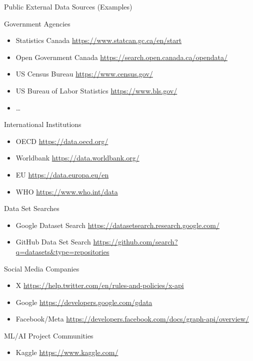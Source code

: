 \documentclass[ignorenonframetext,xcolor=x11names]{beamer}
\begin{document}
\begin{frame}[allowframebreaks]{Public External Data Sources (Examples)}
\begin{block}{Government Agencies}
\begin{itemize}
	\item Statistics Canada \url{https://www.statcan.gc.ca/en/start}
	\item Open Government Canada \url{https://search.open.canada.ca/opendata/}
	\item US Census Bureau \url{https://www.census.gov/}
	\item US Bureau of Labor Statistics \url{https://www.bls.gov/}
	\item \ldots
\end{itemize}
\end{block}
\begin{block}{International Institutions}
\begin{itemize}
	\item OECD \url{https://data.oecd.org/}
	\item Worldbank \url{https://data.worldbank.org/}
	\item EU \url{https://data.europa.eu/en}
	\item WHO \url{https://www.who.int/data}
\end{itemize}
\end{block}
\begin{block}{Data Set Searches}
\begin{itemize}
	\item Google Dataset Search \url{https://datasetsearch.research.google.com/}
	\item GitHub Data Set Search \url{https://github.com/search?q=datasets&type=repositories}
\end{itemize}
\end{block}
\begin{block}{Social Media Companies}
\begin{itemize}
	\item X \url{https://help.twitter.com/en/rules-and-policies/x-api}
	\item Google \url{https://developers.google.com/gdata}
	\item Facebook/Meta \url{https://developers.facebook.com/docs/graph-api/overview/}
\end{itemize}
\end{block}
\begin{block}{ML/AI Project Communities}
\begin{itemize}
	\item Kaggle \url{https://www.kaggle.com/}

\end{itemize}
\end{block}
\end{frame}
\end{document}
